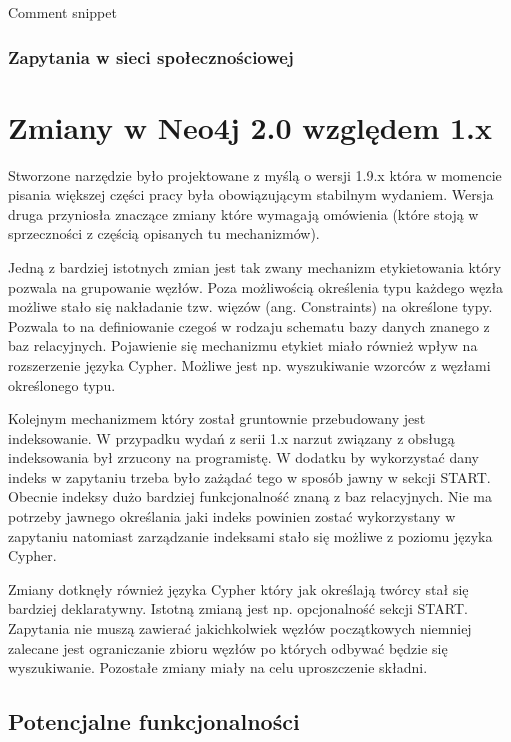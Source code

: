 \documentclass[brudnopis]{xmgr}
\begin{document}
Comment snippet

\subsection{Zapytania w sieci społecznościowej}



\chapter{Zmiany w Neo4j 2.0 względem 1.x}

Stworzone narzędzie było projektowane z myślą o wersji 1.9.x która w momencie pisania większej części pracy była obowiązującym stabilnym wydaniem. Wersja druga przyniosła znaczące zmiany które wymagają omówienia (które stoją w sprzeczności z częścią opisanych tu mechanizmów).

Jedną z bardziej istotnych zmian jest tak zwany mechanizm etykietowania który pozwala na grupowanie węzłów. Poza możliwością określenia typu każdego węzła możliwe stało się nakładanie tzw. więzów (ang. Constraints) na określone typy. Pozwala to na definiowanie czegoś w rodzaju schematu bazy danych znanego z baz relacyjnych. Pojawienie się mechanizmu etykiet miało również wpływ na rozszerzenie języka Cypher. Możliwe jest np. wyszukiwanie wzorców z węzłami określonego typu.

Kolejnym mechanizmem który został gruntownie przebudowany jest indeksowanie. W przypadku wydań z serii 1.x narzut związany z obsługą indeksowania był zrzucony na programistę. W dodatku by wykorzystać dany indeks w zapytaniu trzeba było zażądać tego w sposób jawny w sekcji START. Obecnie indeksy dużo bardziej funkcjonalność znaną z baz relacyjnych. Nie ma potrzeby jawnego określania jaki indeks powinien zostać wykorzystany w zapytaniu natomiast zarządzanie indeksami stało się możliwe z poziomu języka Cypher.

Zmiany dotknęły również języka Cypher który jak określają twórcy stał się bardziej deklaratywny. Istotną zmianą jest np. opcjonalność sekcji START. Zapytania nie muszą zawierać jakichkolwiek węzłów początkowych niemniej zalecane jest ograniczanie zbioru węzłów po których odbywać będzie się wyszukiwanie. Pozostałe zmiany miały na celu uproszczenie składni.

\section{Potencjalne funkcjonalności}
\end{document}
